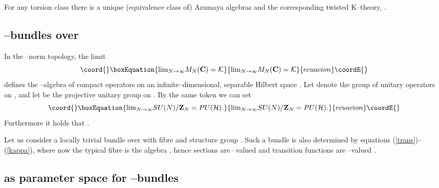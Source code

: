 \documentclass[a4paper,a4paper]{article}
\begin{document}
For any torsion class \coordHE{} there is a unique  
(equivalence class of) Azumaya algebras and the corresponding twisted 
K--theory, \coordHE{} \cite{KAPUSTIN, BOUWMATHAI}.  
  
\subsection{\coordHE{}--bundles over \coordHE{}}\label{kbundles}  
  
In the \coordHE{}--norm topology, the limit \cite{DIXMIERL}
\begin{equation}\coord{}\boxEquation{
{\rm lim}_{N\to\infty}M_N({\bf C})={\cal K}
\label{limkappa}
}{
{\rm lim}_{N\to\infty}M_N({\bf C})={\cal K}
}{ecuacion}\coordE{}\end{equation}
defines the \coordHE{}--algebra \coordHE{} of compact operators on an infinite--dimensional, 
separable Hilbert space \coordHE{}. Let \coordHE{} denote 
the group of unitary operators on \coordHE{}, and let \coordHE{} 
be the projective unitary group on \coordHE{}. By the same token we can set 
\begin{equation}\coord{}\boxEquation{
{\rm lim}_{N\to\infty} SU(N)/{\bf Z}_N=PU({\cal H}).
\label{sett}
}{
{\rm lim}_{N\to\infty} SU(N)/{\bf Z}_N=PU({\cal H}).
}{ecuacion}\coordE{}\end{equation}   
Furthermore it holds that \coordHE{}.  
  
Let us consider a locally trivial bundle \coordHE{} over \coordHE{} with fibre   
\coordHE{} and structure group \coordHE{}. Such a bundle is also
determined by equations (\ref{trans})--(\ref{kappa}), where now the typical fibre 
is the algebra \coordHE{}, hence sections \coordHE{} are \coordHE{}--valued   
and transition functions \coordHE{} are  \coordHE{}--valued \cite{BOUWMATHAI}.  
   
\subsection{\coordHE{} as parameter space for 
\coordHE{}--bundles}\label{parameter}  
  
\end{document}

